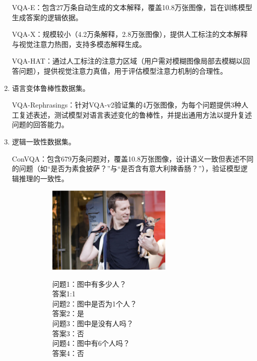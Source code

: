 \begin{enumerate}[itemsep=0pt,parsep=0pt]
​VQA-E\cite{li2018vqa}：包含27万条自动生成的文本解释，覆盖10.8万张图像，旨在训练模型生成答案的逻辑依据。

​VQA-X\cite{park2018multimodal}：规模较小（4.2万条解释，2.8万张图像），提供人工标注的文本解释与视觉注意力热图，支持多模态解释生成。

​VQA-HAT\cite{das2017human}：通过人工标注的注意力区域（用户需对模糊图像局部去模糊以回答问题），提供视觉注意力真值，用于评估模型注意力机制的合理性。
    \item 语言变体鲁棒性数据集。

​VQA-Rephrasings\cite{shah2019cycle}：针对VQA-v2验证集的4万张图像，为每个问题提供3种人工复述表述，测试模型对语言表述变化的鲁棒性，并提出通用方法以提升复述问题的回答能力。
    \item 逻辑一致性数据集。

​ConVQA\cite{ray2018make}：包含679万条问题对，覆盖10.8万张图像，设计语义一致但表述不同的问题（如“是否为素食披萨？”与“是否含有意大利辣香肠？”），验证模型逻辑推理的一致性。
\begin{figure}
    \begin{subfigure}[b]{0.45\textwidth}
        \centering
        \includegraphics[width=0.7\textwidth, keepaspectratio]{figures/CONVQA-A.png}
        \begin{center}
            \footnotesize 问题1：图中有多少人？\\
            \footnotesize 答案1:1\\
            \footnotesize 问题2：图中是否为1个人？\\
            \footnotesize 答案2：是\\
            \footnotesize 问题3：图中是没有人吗？\\
            \footnotesize 答案3：否\\
            \footnotesize 问题4：图中有6个人吗？\\
            \footnotesize 答案4：否\\

\end{center}
\end{subfigure}
\end{figure}
\end{enumerate}
